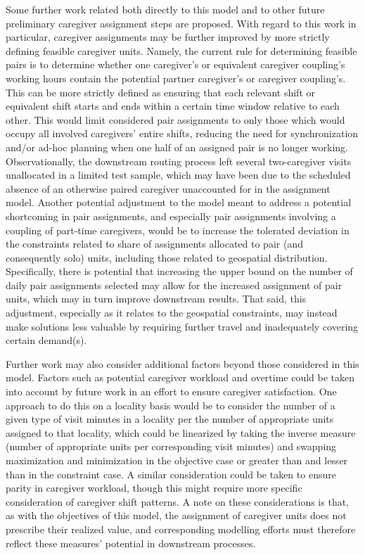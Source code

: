 \documentclass[11pt,twoside]{article}
\numberwithin{Theorem}{section}
\numberwithin{Definition}{section}
\numberwithin{Lemma}{section}
\numberwithin{Algorithm}{section}
\numberwithin{equation}{section}
\begin{document}
Some further work related both directly to this model and to other future preliminary caregiver assignment steps are proposed. With regard to this work in particular, caregiver assignments may be further improved by more strictly defining feasible caregiver units. Namely, the current rule for determining feasible pairs is to determine whether one caregiver's or equivalent caregiver coupling's working hours contain the potential partner caregiver's or caregiver coupling's. This can be more strictly defined as ensuring that each relevant shift or equivalent shift starts and ends within a certain time window relative to each other. This would limit considered pair assignments to only those which would occupy all involved caregivers' entire shifts, reducing the need for synchronization and/or ad-hoc planning when one half of an assigned pair is no longer working. Observationally, the downstream routing process left several two-caregiver visits unallocated in a limited test sample, which may have been due to the scheduled absence of an otherwise paired caregiver unaccounted for in the assignment model. Another potential adjustment to the model meant to address a potential shortcoming in pair assignments, and especially pair assignments involving a coupling of part-time caregivers, would be to increase the tolerated deviation in the constraints related to share of assignments allocated to pair (and consequently solo) units, including those related to geospatial distribution. Specifically, there is potential that increasing the upper bound on the number of daily pair assignments selected may allow for the increased assignment of pair units, which may in turn improve downstream results. That said, this adjustment, especially as it relates to the geospatial constraints, may instead make solutions less valuable by requiring further travel and inadequately covering certain demand(s).

Further work may also consider additional factors beyond those considered in this model. Factors such as potential caregiver workload and overtime could be taken into account by future work in an effort to ensure caregiver satisfaction. One approach to do this on a locality basis would be to consider the number of a given type of visit minutes in a locality per the number of appropriate units assigned to that locality, which could be linearized by taking the inverse measure (number of appropriate units per corresponding visit minutes) and swapping maximization and minimization in the objective case or greater than and lesser than in the constraint case. A similar consideration could be taken to ensure parity in caregiver workload, though this might require more specific consideration of caregiver shift patterns. A note on these considerations is that, as with the objectives of this model, the assignment of caregiver units does not prescribe their realized value, and corresponding modelling efforts must therefore reflect these measures' potential in downstream processes.
\end{document}

